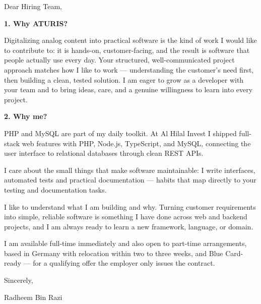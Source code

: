 \documentclass[11pt,a4paper]{coverletter}
\begin{document}

\opening{Dear Hiring Team,}

\vspace{8pt}\noindent\textbf{1. Why ATURIS?}\par\vspace{3pt}

Digitalizing analog content into practical software is the kind of work I would like to contribute to: it is hands-on, customer-facing, and the result is software that people actually use every day. Your structured, well-communicated project approach matches how I like to work — understanding the customer's need first, then building a clean, tested solution. I am eager to grow as a developer with your team and to bring ideas, care, and a genuine willingness to learn into every project.

\vspace{8pt}\noindent\textbf{2. Why me?}\par\vspace{3pt}

\bullets

  \item PHP and MySQL are part of my daily toolkit. At Al Hilal Invest I shipped full-stack web features with PHP, Node.js, TypeScript, and MySQL, connecting the user interface to relational databases through clean REST APIs.

  \item I care about the small things that make software maintainable: I write interfaces, automated tests and practical documentation — habits that map directly to your testing and documentation tasks.

  \item I like to understand what I am building and why. Turning customer requirements into simple, reliable software is something I have done across web and backend projects, and I am always ready to learn a new framework, language, or domain.

\bulletsend

I am available full-time immediately and also open to part-time arrangements, based in Germany with relocation within two to three weeks, and Blue Card-ready — for a qualifying offer the employer only issues the contract.

\closing{Sincerely,}{Radheem Bin Razi}

\clearpage
{}

\end{document}
